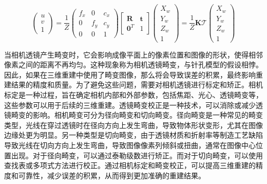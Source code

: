\begin{equation}
\left(\begin{array}{c}
u \\
v \\
1
\end{array}\right)=\frac{1}{Z}\left(\begin{array}{ccc}
f_{x} & 0 & c_{x} \\
0 & f_{y} & c_{y} \\
0 & 0 & 1
\end{array}\right)\left[\begin{array}{cc}
\boldsymbol{R} & \boldsymbol{t} \\
\mathbf{0}^{T} & 1
\end{array}\right]\left(\begin{array}{c}
X_{w} \\
Y_{w} \\
Z_{w} \\
1
\end{array}\right)=\frac{1}{Z} \boldsymbol{K} \mathcal{T}\left(\begin{array}{c}
X_{w} \\
Y_{w} \\
Z_{w} \\
1
\end{array}\right)
\end{equation}

当相机透镜产生畸变时，它会影响成像平面上的像素位置和图像的形状，使得相邻像素之间的距离不再均匀。这种现象称为相机透镜畸变，与针孔模型的假设相悖。因此，如果在三维重建中使用了畸变图像，那么将会导致误差的积累，最终影响重建结果的精度和质量。为了避免这些问题，需要对相机透镜进行标定和矫正。相机标定是一种过程，旨在确定相机内部和外部参数，包括焦距、光心、透镜畸变等，这些参数可以用于后续的三维重建。透镜畸变校正是一种技术，可以消除或减少透镜畸变的影响。相机畸变可分为径向畸变和切向畸变。径向畸变是一种常见的畸变类型，光线在穿过透镜时在径向方向上发生弯曲，导致物体形状变形，尤其在图像边缘处更为明显。另一种类型是切向畸变，由于透镜材质和折射率等制造工艺缺陷导致光线在切向方向上发生弯曲，导致图像像素列倾斜或扭曲，通常在图像中心位置出现。对于径向畸变，可以通过泰勒级数进行矫正。而对于切向畸变，可以使用查找表或多项式方法进行校正。通过相机标定和畸变校正，可以提高三维重建的精度和可靠性，减少误差的积累，从而得到更加准确的重建结果。
\vspace{-2em}


